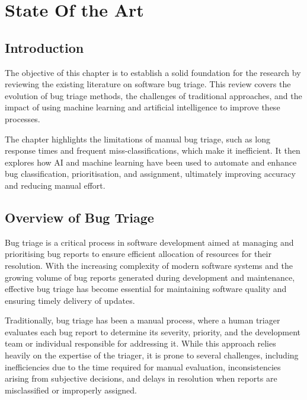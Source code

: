 
%

\chapter{State Of the Art}
\label{cha:users_manual}


\section{Introduction}
\label{sec:introduction}

The objective of this chapter is to establish a solid foundation for the research by reviewing the existing literature on software bug triage. This review covers the evolution of bug triage methods, the challenges of traditional approaches, and the impact of using machine learning and artificial intelligence to improve these processes.

The chapter highlights the limitations of manual bug triage, such as long response times and frequent miss-classifications, which make it inefficient. It then explores how AI and machine learning have been used to automate and enhance bug classification, prioritisation, and assignment, ultimately improving accuracy and reducing manual effort.

\section{Overview of Bug Triage}
\label{sec:overview_of_bug_triage}

Bug triage is a critical process in software development aimed at managing and prioritising bug reports to ensure efficient allocation of resources for their resolution. With the increasing complexity of modern software systems and the growing volume of bug reports generated during development and maintenance, effective bug triage has become essential for maintaining software quality and ensuring timely delivery of updates.

Traditionally, bug triage has been a manual process, where a human triager evaluates each bug report to determine its severity, priority, and the development team or individual responsible for addressing it. While this approach relies heavily on the expertise of the triager, it is prone to several challenges, including inefficiencies due to the time required for manual evaluation, inconsistencies arising from subjective decisions, and delays in resolution when reports are misclassified or improperly assigned.

